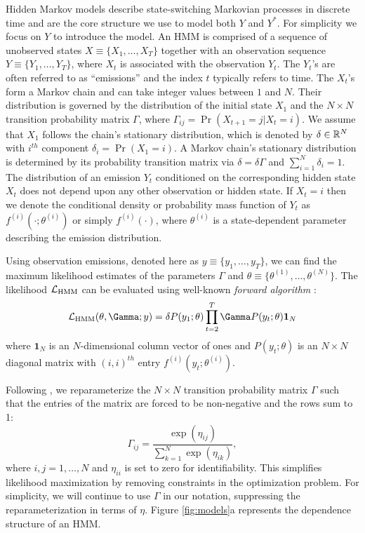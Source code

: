 Hidden Markov models describe state-switching Markovian processes in discrete time and are the core structure we use to model both $Y$ and $Y^*$. For simplicity we focus on $Y$ to introduce the model. An HMM is comprised of a sequence of unobserved states $X \equiv \big\{X_1, \ldots, X_T\big\}$ together with an observation sequence $Y \equiv \big\{Y_1, \ldots, Y_T\big\}$, where $X_t$ is associated with the observation $Y_t$. The $Y_t$'s are often referred to as ``emissions'' and the index $t$ typically refers to time. 
The $X_t$'s form a Markov chain and can take integer values between $1$ and $N$. Their distribution is governed by the distribution of the initial state $X_1$ and the $N \times N$ transition probability matrix $\Gamma$, where $\Gamma_{ij} = \Pr(X_{t+1} = j | X_t = i)$. 
%
We assume that $X_1$ follows the chain's stationary distribution, which is denoted by $\delta \in \mathbb{R}^N$ with $i^{th}$ component
$\delta_i = \Pr(X_1 = i).$
A Markov chain's stationary distribution is determined by its probability transition matrix via $\delta = \delta \Gamma$ and $\sum_{i=1}^N \delta_i = 1$.
%
The distribution of an emission $Y_t$ conditioned on the corresponding hidden state $X_t$ does not depend upon any other observation or hidden state.
%
If $X_t=i$ then we denote the conditional density or probability mass function of $Y_t$ as $f^{(i)}(\cdot ; \theta^{(i)})$ or simply $f^{(i)}(\cdot)$, where $\theta^{(i)}$ is a state-dependent parameter describing the emission distribution.
%

Using observation emissions, denoted here as $y \equiv \{y_1,\ldots,y_T\}$, we can find the maximum likelihood estimates of the parameters $\Gamma$ and $\theta \equiv \{\theta^{(1)},\ldots,\theta^{(N)}\}$. The likelihood $\mathcal{L}_{\text{HMM}}$ can be evaluated using well-known \textit{forward algorithm} \citep{Zucchini:2016}:
%
$$\calL_{\text{HMM}}(\theta,\Gamma;y) = \delta P(y_1;\theta) \prod_{t=2}^T \Gamma P(y_t;\theta) \mathbf{1}_N$$
%
where $\mathbf{1}_N$ is an $N$-dimensional column vector of ones and
%
$P(y_t;\theta)$ is an $N \times N$ diagonal matrix with $(i,i)^{th}$ entry $f^{(i)}(y_t; \theta^{(i)})$.
%

Following \citet{Barajas:2017}, we reparameterize the $N \times N$ transition probability matrix $\Gamma$ such that the entries of the matrix are forced to be non-negative and the rows sum to 1:
%
\[
\Gamma_{ij} = \frac{\exp(\eta_{ij})}{\sum_{k=1}^N \exp(\eta_{ik})}, 
\]
%
where $i,j = 1,\ldots,N$ and $\eta_{ii}$ is set to zero for identifiability. This simplifies likelihood maximization by removing constraints in the optimization problem. For simplicity, we will continue to use $\Gamma$ in our notation, suppressing the reparameterization in terms of $\eta$. Figure \ref{fig:models}a represents the dependence structure of an HMM.

